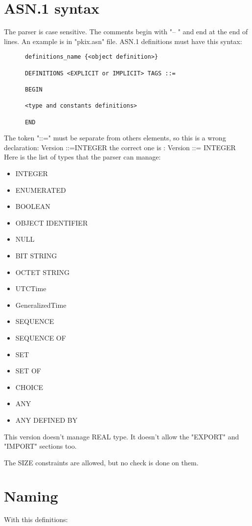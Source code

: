\documentclass{book}
\begin{document}
\section{ASN.1 syntax}
The parser is case sensitive. The comments begin with "-- " and end at the end of lines.
An example is in "pkix.asn" file.
ASN.1 definitions must have this syntax:
      
\begin{verbatim}
      definitions_name {<object definition>}

      DEFINITIONS <EXPLICIT or IMPLICIT> TAGS ::=

      BEGIN 

      <type and constants definitions>

      END
\end{verbatim}

\par
The token "::=" must be separate from others elements, so this is a wrong declaration:
      Version ::=INTEGER 
the correct one is :   Version ::= INTEGER
Here is the list of types that the parser can manage:
\begin{itemize}

\item      INTEGER
\item      ENUMERATED
\item      BOOLEAN
\item      OBJECT IDENTIFIER
\item      NULL
\item      BIT STRING
\item      OCTET STRING
\item      UTCTime
\item      GeneralizedTime
\item      SEQUENCE
\item      SEQUENCE OF
\item      SET 
\item      SET OF
\item      CHOICE
\item      ANY
\item      ANY DEFINED BY
\end{itemize}

This version doesn't manage REAL type. It doesn't allow the  
"EXPORT" and "IMPORT" sections too.

The SIZE constraints are allowed, but no check is done on them.



\section{Naming}
With this definitions:
\end{document}
